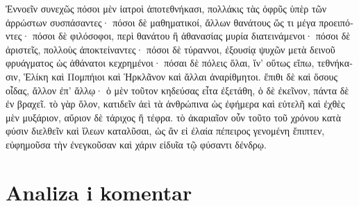 \medskip


{\large

\begin{greek}

\noindent  Ἐννοεῖν συνεχῶς πόσοι μὲν ἰατροὶ ἀποτεθνήκασι, πολλάκις τὰς ὀφρῦς ὑπὲρ τῶν ἀρρώστων συσπάσαντες· πόσοι δὲ μαθηματικοί, ἄλλων θανάτους ὥς τι μέγα προειπόντες· πόσοι δὲ φιλόσοφοι, περὶ θανάτου ἢ ἀθανασίας μυρία διατεινάμενοι· πόσοι δὲ ἀριστεῖς, πολλοὺς ἀποκτείναντες· πόσοι δὲ τύραννοι, ἐξουσίᾳ ψυχῶν μετὰ δεινοῦ φρυάγματος ὡς ἀθάνατοι κεχρημένοι· πόσαι δὲ πόλεις ὅλαι, ἵν' οὕτως εἴπω, τεθνήκασιν, Ἑλίκη καὶ Πομπήιοι καὶ Ἡρκλᾶνον καὶ ἄλλαι ἀναρίθμητοι. ἔπιθι δὲ καὶ ὅσους οἶδας, ἄλλον ἐπ' ἄλλῳ· ὁ μὲν τοῦτον κηδεύσας εἶτα ἐξετάθη, ὁ δὲ ἐκεῖνον, πάντα δὲ ἐν βραχεῖ. τὸ γὰρ ὅλον, κατιδεῖν ἀεὶ τὰ ἀνθρώπινα ὡς ἐφήμερα καὶ εὐτελῆ καὶ ἐχθὲς μὲν μυξάριον, αὔριον δὲ τάριχος ἢ τέφρα. τὸ ἀκαριαῖον οὖν τοῦτο τοῦ χρόνου κατὰ φύσιν διελθεῖν καὶ ἵλεων καταλῦσαι, ὡς ἂν εἰ ἐλαία πέπειρος γενομένη ἔπιπτεν, εὐφημοῦσα τὴν ἐνεγκοῦσαν καὶ χάριν εἰδυῖα τῷ φύσαντι δένδρῳ.


\end{greek}

}


\section*{Analiza i komentar}


